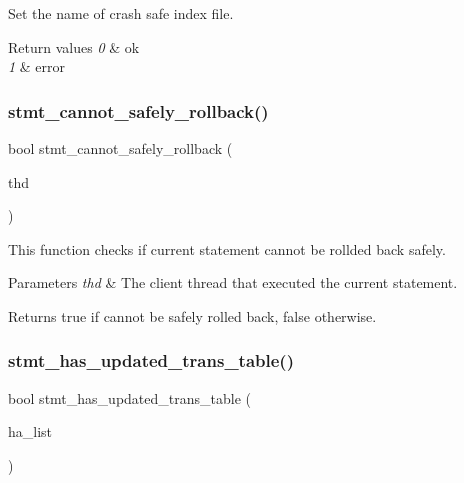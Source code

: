 Set the name of crash safe index file.


\begin{DoxyRetVals}{Return values}
{\em 0} & ok \\
\hline
{\em 1} & error \\
\hline
\end{DoxyRetVals}
\mbox{\label{group__Binary__Log_ga07a668f531f059316c8f17dfcecfd465}} 
\subsubsection{\texorpdfstring{stmt\+\_\+cannot\+\_\+safely\+\_\+rollback()}{stmt\_cannot\_safely\_rollback()}}
{\footnotesize\ttfamily bool stmt\+\_\+cannot\+\_\+safely\+\_\+rollback (\begin{DoxyParamCaption}\item[{const T\+HD $\ast$}]{thd }\end{DoxyParamCaption})}

This function checks if current statement cannot be rollded back safely.


\begin{DoxyParams}{Parameters}
{\em thd} & The client thread that executed the current statement. \\
\hline
\end{DoxyParams}
\begin{DoxyReturn}{Returns}
{\ttfamily true} if cannot be safely rolled back, {\ttfamily false} otherwise. 
\end{DoxyReturn}
\mbox{\label{group__Binary__Log_gaf43af0e4821421ea58375e7d4943c6c0}} 
\subsubsection{\texorpdfstring{stmt\+\_\+has\+\_\+updated\+\_\+trans\+\_\+table()}{stmt\_has\_updated\_trans\_table()}}
{\footnotesize\ttfamily bool stmt\+\_\+has\+\_\+updated\+\_\+trans\+\_\+table (\begin{DoxyParamCaption}\item[{\mbox{\hyperlink{classHa__trx__info}{Ha\+\_\+trx\+\_\+info}} $\ast$}]{ha\+\_\+list }\end{DoxyParamCaption})}

